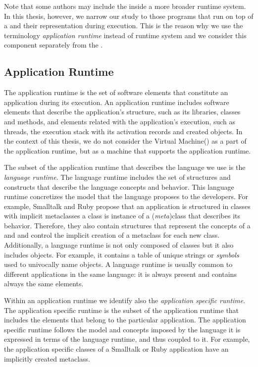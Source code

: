 Note that some authors may include the \VM inside a more broader runtime system. In this thesis, however, we narrow our study to those programs that run on top of a \VM and their representation during execution. This is the reason why we use the terminology \emph{application runtime} instead of runtime system and we consider this component separately from the \VM.

\subsection{Application Runtime}

The application runtime is the set of software elements that constitute an application during its execution. An application runtime includes software elements that describe the application's structure, such as its libraries, classes and methods, and elements related with the application's execution, such as threads, the execution stack with its activation records and created objects. In the context of this thesis, we do not consider the Virtual Machine(\VM) as a part of the application runtime, but as a machine that supports the application runtime.

The subset of the application runtime that describes the language we use is the \emph{language runtime}. The language runtime includes the set of structures and constructs that describe the language concepts and behavior. This language runtime concretizes the model that the language proposes to the developers. For example, Smalltalk and Ruby propose that an application is structured in classes with implicit metaclasses \ie a class is instance of a (\emph{meta})class that describes its behavior. Therefore, they also contain structures that represent the concepts of a  and  and control the implicit creation of a metaclass for each new class. Additionally, a language runtime is not only composed of classes but it also includes objects. For example, it contains a table of unique strings or \emph{symbols} used to univocally name objects. A language runtime is usually common to different applications in the same language: it is always present and contains always the same elements.

Within an application runtime we identify also the \emph{application specific runtime}. The application specific runtime is the subset of the application runtime that includes the elements that belong to the particular application. The application specific runtime follows the model and concepts imposed by the language \ie it is expressed in terms of the language runtime, and thus coupled to it. For example, the application specific classes of a Smalltalk or Ruby application have an implicitly created metaclass.

